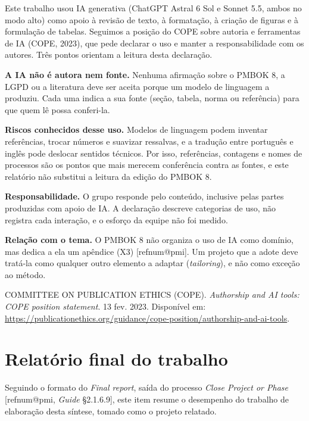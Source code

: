 \documentclass[11pt,a4paper]{article}
\makeatletter
\newcommand{\refnum}[1]{\csname refnum@#1\endcsname}
\newcommand{\cit}[1]{[\refnum{#1}]}
\makeatother
\begin{document}
Este trabalho usou IA generativa (ChatGPT Astral 6 Sol e Sonnet 5.5, ambos no modo alto) como apoio à revisão de texto, à formatação, à criação de figuras e à formulação de tabelas. Seguimos a posição do COPE sobre autoria e ferramentas de IA (COPE, 2023), que pede declarar o uso e manter a responsabilidade com os autores. Três pontos orientam a leitura desta declaração.

\textbf{A IA não é autora nem fonte.} Nenhuma afirmação sobre o PMBOK 8, a LGPD ou a literatura deve ser aceita porque um modelo de linguagem a produziu. Cada uma indica a sua fonte (seção, tabela, norma ou referência) para que quem lê possa conferi-la.

\textbf{Riscos conhecidos desse uso.} Modelos de linguagem podem inventar referências, trocar números e suavizar ressalvas, e a tradução entre português e inglês pode deslocar sentidos técnicos. Por isso, referências, contagens e nomes de processos são os pontos que mais merecem conferência contra as fontes, e este relatório não substitui a leitura da edição do PMBOK 8.

\textbf{Responsabilidade.} O grupo responde pelo conteúdo, inclusive pelas partes produzidas com apoio de IA. A declaração descreve categorias de uso, não registra cada interação, e o esforço da equipe não foi medido.

\textbf{Relação com o tema.} O PMBOK 8 não organiza o uso de IA como domínio, mas dedica a ela um apêndice (X3) \cit{pmi}. Um projeto que a adote deve tratá-la como qualquer outro elemento a adaptar (\textit{tailoring}), e não como exceção ao método.

\begingroup\small\noindent COMMITTEE ON PUBLICATION ETHICS (COPE). \textit{Authorship and AI tools: COPE position statement}. 13 fev. 2023. Disponível em: \url{https://publicationethics.org/guidance/cope-position/authorship-and-ai-tools}.\par\endgroup
\fi

\section{Relatório final do trabalho}

Seguindo o formato do \textit{Final report}, saída do processo \textit{Close Project or Phase} [\refnum{pmi}, \textit{Guide} §2.1.6.9], este item resume o desempenho do trabalho de elaboração desta síntese, tomado como o projeto relatado.
\end{document}
